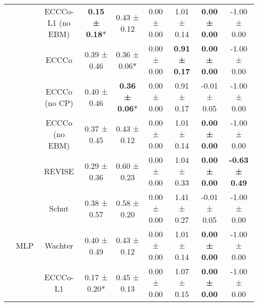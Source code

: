 \begin{longtable}[t]{ccccccccc}
 &  & ECCCo-L1 (no EBM) & \textbf{0.15 ± 0.18}*\hphantom{*} & 0.43 ± 0.12\hphantom{*}\hphantom{*} & 0.00 ± 0.00\hphantom{*}\hphantom{*} & 1.01 ± 0.14\hphantom{*}\hphantom{*} & \textbf{0.00 ± 0.00}\hphantom{*}\hphantom{*} & -1.00 ± 0.00\hphantom{*}\hphantom{*}\\

 &  & ECCCo & 0.39 ± 0.46\hphantom{*}\hphantom{*} & 0.36 ± 0.06*\hphantom{*} & 0.00 ± 0.00\hphantom{*}\hphantom{*} & \textbf{0.91 ± 0.17}\hphantom{*}\hphantom{*} & \textbf{0.00 ± 0.00}\hphantom{*}\hphantom{*} & -1.00 ± 0.00\hphantom{*}\hphantom{*}\\

 &  & ECCCo (no CP) & 0.40 ± 0.46\hphantom{*}\hphantom{*} & \textbf{0.36 ± 0.06}*\hphantom{*} & 0.00 ± 0.00\hphantom{*}\hphantom{*} & 0.91 ± 0.17\hphantom{*}\hphantom{*} & -0.01 ± 0.05\hphantom{*}\hphantom{*} & -1.00 ± 0.00\hphantom{*}\hphantom{*}\\

 &  & ECCCo (no EBM) & 0.37 ± 0.45\hphantom{*}\hphantom{*} & 0.43 ± 0.12\hphantom{*}\hphantom{*} & 0.00 ± 0.00\hphantom{*}\hphantom{*} & 1.01 ± 0.14\hphantom{*}\hphantom{*} & \textbf{0.00 ± 0.00}\hphantom{*}\hphantom{*} & -1.00 ± 0.00\hphantom{*}\hphantom{*}\\

 &  & REVISE & 0.29 ± 0.36\hphantom{*}\hphantom{*} & 0.60 ± 0.23\hphantom{*}\hphantom{*} & 0.00 ± 0.00\hphantom{*}\hphantom{*} & 1.04 ± 0.33\hphantom{*}\hphantom{*} & \textbf{0.00 ± 0.00}\hphantom{*}\hphantom{*} & \textbf{-0.63 ± 0.49}\hphantom{*}\hphantom{*}\\

 &  & Schut & 0.38 ± 0.57\hphantom{*}\hphantom{*} & 0.58 ± 0.20\hphantom{*}\hphantom{*} & 0.00 ± 0.00\hphantom{*}\hphantom{*} & 1.41 ± 0.27\hphantom{*}\hphantom{*} & -0.01 ± 0.05\hphantom{*}\hphantom{*} & -1.00 ± 0.00\hphantom{*}\hphantom{*}\\

 & \multirow[t]{-9}{*}{\centering\arraybackslash MLP} & Wachter & 0.40 ± 0.49\hphantom{*}\hphantom{*} & 0.43 ± 0.12\hphantom{*}\hphantom{*} & 0.00 ± 0.00\hphantom{*}\hphantom{*} & 1.01 ± 0.14\hphantom{*}\hphantom{*} & \textbf{0.00 ± 0.00}\hphantom{*}\hphantom{*} & -1.00 ± 0.00\hphantom{*}\hphantom{*}\\
\cmidrule{2-9}
 &  & ECCCo-L1 & 0.17 ± 0.20*\hphantom{*} & 0.45 ± 0.13\hphantom{*}\hphantom{*} & 0.00 ± 0.00\hphantom{*}\hphantom{*} & 1.07 ± 0.15\hphantom{*}\hphantom{*} & \textbf{0.00 ± 0.00}\hphantom{*}\hphantom{*} & -1.00 ± 0.00\hphantom{*}\hphantom{*}\\


\end{longtable}
